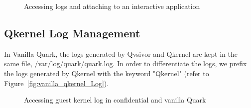 \begin{figure}[!htb]


  
    \caption[Accessing logs and attaching to an interactive application ]{Accessing logs and attaching to an interactive application }
\end{figure}



\subsection{Qkernel Log Management}

In Vanilla Quark, the logs generated by Qvsivor and Qkernel are kept in the same file, /var/log/quark/quark.log. In order to differentiate the logs, we prefix the logs generated by Qkernel with the keyword "Qkernel" (refer to Figure~\ref{fig:vanilla_qkernel_Log}).
\begin{figure}[!htb]


  
    \caption[Accessing guest kernel log in confidential and vanilla Quark]{Accessing guest kernel log in confidential and vanilla Quark}
\end{figure}


